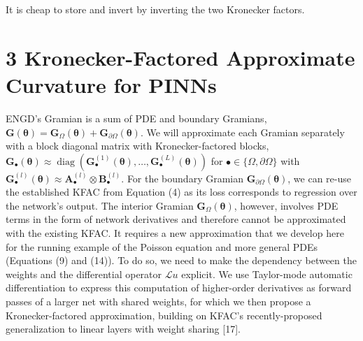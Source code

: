 \documentclass[10pt]{article}
\begin{document}
It is cheap to store and invert by inverting the two Kronecker factors.

\section*{3 Kronecker-Factored Approximate Curvature for PINNs}
ENGD's Gramian is a sum of PDE and boundary Gramians, $\boldsymbol{G}(\boldsymbol{\theta})=\boldsymbol{G}_{\Omega}(\boldsymbol{\theta})+\boldsymbol{G}_{\partial \Omega}(\boldsymbol{\theta})$. We will approximate each Gramian separately with a block diagonal matrix with Kronecker-factored blocks, $\boldsymbol{G}_{\bullet}(\boldsymbol{\theta}) \approx \operatorname{diag}\left(\boldsymbol{G}_{\bullet}^{(1)}(\boldsymbol{\theta}), \ldots, \boldsymbol{G}_{\bullet}^{(L)}(\boldsymbol{\theta})\right)$ for $\bullet \in\{\Omega, \partial \Omega\}$ with $\boldsymbol{G}_{\bullet}^{(l)}(\boldsymbol{\theta}) \approx \boldsymbol{A}_{\bullet}^{(l)} \otimes \boldsymbol{B}_{\bullet}^{(l)}$. For the boundary Gramian $\boldsymbol{G}_{\partial \Omega}(\boldsymbol{\theta})$, we can re-use the established KFAC from Equation (4) as its loss corresponds to regression over the network's output. The interior Gramian $\boldsymbol{G}_{\Omega}(\boldsymbol{\theta})$, however, involves PDE terms in the form of network derivatives and therefore cannot be approximated with the existing KFAC. It requires a new approximation that we develop here for the running example of the Poisson equation and more general PDEs (Equations (9) and (14)). To do so, we need to make the dependency between the weights and the differential operator $\mathcal{L} u$ explicit. We use Taylor-mode automatic differentiation to express this computation of higher-order derivatives as forward passes of a larger net with shared weights, for which we then propose a Kronecker-factored approximation, building on KFAC's recently-proposed generalization to linear layers with weight sharing [17].
\end{document}
